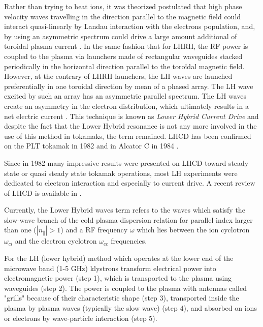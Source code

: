 Rather than trying to heat ions, it was theorized postulated that high phase velocity waves travelling in the direction parallel to the magnetic field could interact quasi-linearly by Landau interaction with the electrons population, and, by using an asymmetric spectrum could drive a large amount additional of toroidal plasma current . In the same fashion that for LHRH, the RF power is coupled to the plasma via launchers made of rectangular waveguides stacked periodically in the horizontal direction parallel to the toroïdal magnetic field. However, at the contrary of LHRH launchers, the LH waves are launched preferentially in one toroidal direction by mean of a phased array. The LH wave excited by such an array has an asymmetric parallel spectrum. The LH waves create an asymmetry in the electron distribution, which ultimately results in a net electric current . This technique is known as \emph{Lower Hybrid Current Drive} and despite the fact that the Lower Hybrid resonance is not any more involved in the use of this method in tokamaks, the term remained. LHCD has been confirmed on the PLT tokamak in 1982  and in Alcator C in 1984 . 

Since in 1982 many impressive results were presented on LHCD toward steady state or quasi steady state tokamak operations, most LH experiments were dedicated to electron interaction and especially to current drive. A recent review of LHCD is available in .

Currently, the Lower Hybrid waves term refers to the waves which satisfy the slow-wave branch of the cold plasma dispersion relation for parallel index larger than one ($|n_{\parallel}|>1$) and a RF frequency $\omega$ which lies between the ion cyclotron $\omega_{ci}$ and the electron cyclotron $\omega_{ce}$ frequencies. 

For the LH (lower hybrid) method which operates at the lower end of the microwave band (1-5 GHz) klystrons transform electrical power into electromagnetic power (step 1), which is transported to the plasma using waveguides (step 2). The power is coupled to the plasma with antennas called "grills" because of their characteristic shape (step 3), transported inside the plasma by plasma waves (typically the slow wave) (step 4), and absorbed on ions or electrons by wave-particle interaction (step 5).
